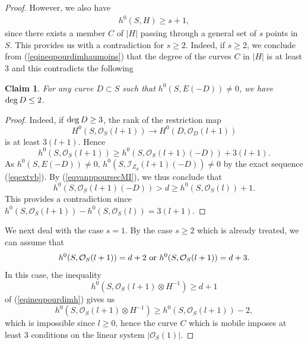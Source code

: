 \documentclass[10pt]{article}
\newtheorem{claim}[theo]{Claim}
\begin{document}
\begin{proof}
However,  we also have \begin{eqnarray}\label{eqineqpourdimhaumoins} h^0(S, H)\geq s+1,\end{eqnarray} since there exists a member $C$ of $|H|$ passing through a general set of $s$ points in $S$.
This provides  us with a contradiction for $s\geq 2$. Indeed, if $s\geq 2$,  we conclude from (\ref{eqineqpourdimhaumoins}) that the degree of the curves $C$ in $|H|$ is at least $3$ and
this contradicts  the following
\begin{claim} \label{claim} For any curve $D\subset S$ such that $h^0(S,E(-D))\not=0$, we have ${\rm deg}\,D\leq 2$.
\end{claim}
\begin{proof} Indeed, if ${\rm deg}\,D\geq 3$, the rank of the restriction map
$$H^0(S,\mathcal{O}_S(l+1))\rightarrow H^0(D,\mathcal{O}_D(l+1))$$ is at least $3(l+1)$. Hence
$$h^0(S,\mathcal{O}_S(l+1))\geq h^0(S,\mathcal{O}_S(l+1)(-D))+3(l+1).$$
As $h^0(S,E(-D))\not=0$,  $h^0(S,\mathcal{I}_{Z_d}(l+1)(-D))\not=0$ by the exact sequence (\ref{eqextvb}). By (\ref{eqvanppoursecMI}), we thus conclude that
$$h^0(S,\mathcal{O}_{S}(l+1)(-D))> d \geq h^0(S,\mathcal{O}_{S}(l))+1.$$
 This provides a contradiction since $h^0(S,\mathcal{O}_S(l+1))-h^0(S,\mathcal{O}_S(l))=3(l+1)$.
\end{proof}



We next deal with the case $s=1$. By the case $s\geq 2$ which is already treated, we can assume that \begin{eqnarray}\label{eqasshO} h^0(S,\mathcal{O}_S(l+1))=d+2\,\,{\rm or} \,\,h^0(S,\mathcal{O}_S(l+1))=d+3.
\end{eqnarray}
In this case, the inequality $$ h^0(S,\mathcal{O}_S(l+1)\otimes H^{-1})\geq d+1$$
of (\ref{eqineqpourdimh}) gives us
$$h^0(S,\mathcal{O}_S(l+1)\otimes H^{-1})\geq h^0(S,\mathcal{O}_S(l+1))-2,$$
which is impossible since $l\geq 0$, hence the curve $C$ which is mobile  imposes at least $3$ conditions on the linear system $|\mathcal{O}_S(1)|$.



\end{proof}
\end{document}
